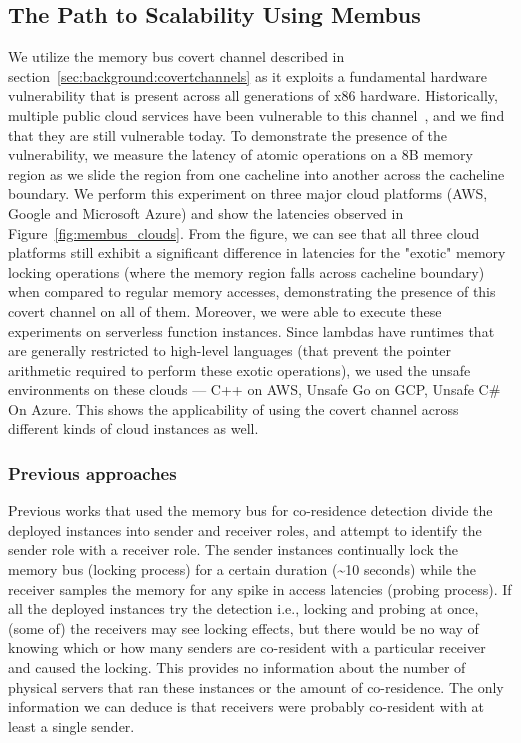 \subsection{The Path to Scalability Using Membus}
We utilize the memory bus covert channel described in
section~\ref{sec:background:covertchannels} as it exploits a fundamental
hardware vulnerability that is present across all generations of x86 hardware.
Historically, multiple public cloud services have been vulnerable to this
channel~\cite{varad191016,zhang2016}, and we find that they are still
vulnerable today. To demonstrate the presence of the vulnerability, we measure
the latency of atomic operations on a 8B memory region as we slide the region
from one cacheline into another across the cacheline boundary. We perform this
experiment on three major cloud platforms (AWS, Google and Microsoft Azure) and
show the latencies observed in Figure~\ref{fig:membus_clouds}. From the figure,
we can see that all three cloud platforms still exhibit a significant difference
in latencies for the "exotic" memory locking operations (where the memory region
falls across cacheline boundary) when compared to regular memory accesses,
demonstrating the presence of this covert channel on all of them. Moreover, we
were able to execute these experiments on serverless function instances. Since
lambdas have runtimes that are generally restricted to high-level languages
(that prevent the pointer arithmetic required to perform these exotic
operations), we used the unsafe environments on these clouds --- C++ on AWS,
Unsafe Go on GCP, Unsafe C\# On Azure. This shows the applicability of using the
covert channel across different kinds of cloud instances as well.


\subsubsection{Previous approaches}
Previous works that used the memory bus for co-residence detection divide the
deployed instances into sender and receiver roles, and attempt to identify the
sender role with a receiver role. The sender instances continually lock the
memory bus (locking process) for a certain duration (\textasciitilde 10 seconds)
while the receiver samples the memory for any spike in access latencies (probing
process). If all the deployed instances try the detection i.e., locking and
probing at once, (some of) the receivers may see locking effects, but there
would be no way of knowing which or how many senders are co-resident with a
particular receiver and caused the locking. This provides no information about
the number of physical servers that ran these instances or the amount of
co-residence. The only information we can deduce is that receivers were probably
co-resident with at least a single sender.

